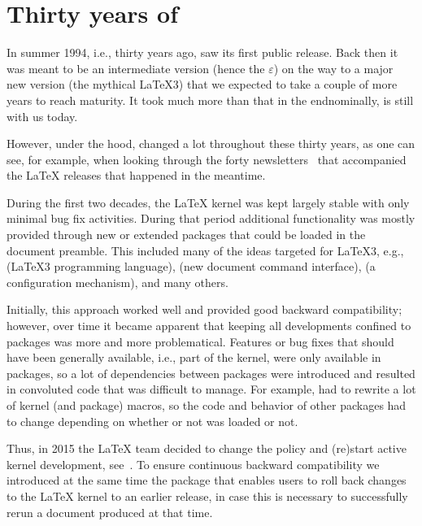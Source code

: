 \documentclass{ltnews}
\providecommand\Dash {\unskip \textemdash}
\begin{document}
\maketitle
{  \spaceskip=3.33pt 
\tableofcontents}

\setlength{}

\medskip


\section{Thirty years of \LaTeXe{}}

In summer 1994, i.e., thirty years ago, \LaTeXe{} saw its first public
release. Back then it was meant to be an intermediate version (hence
the $\varepsilon$) on the way to a major new version (the mythical
\LaTeX3) that we expected to take a couple of more years to reach
maturity. It took much more than that in the end\Dash nominally,
\LaTeXe{} is still with us today.

However, under the hood, \LaTeXe{} changed a lot throughout these
thirty years, as one can see, for example, when looking through the
forty newsletters~\cite{40:ltnews} that accompanied the \LaTeX{}
releases that happened in the meantime.

During the first two decades, the \LaTeX{} kernel was kept largely
stable with only minimal bug fix activities. During that period
additional functionality was mostly provided through new or
extended packages that could be loaded in the document preamble. This
included many of the ideas targeted for \LaTeX3{}, e.g., 
(\LaTeX3 programming language),  (new document command
interface),  (a configuration mechanism), and many
others.

Initially, this approach worked well and provided good backward
compatibility; however, over time it became apparent that keeping all
developments confined to packages was more and more problematical.
Features or bug fixes that should have been generally available, i.e.,
part of the kernel, were only available in packages, so a lot of
dependencies between packages were introduced and resulted in
convoluted code that was difficult to manage. For example,
 had to rewrite a lot of kernel (and package) macros, so
the code and behavior of other packages had to change depending on
whether or not  was loaded or not.

Thus, in 2015 the \LaTeX{} team decided to change the policy and
(re)start active kernel development, see~\cite{40:ltnews22}. To ensure
continuous backward compatibility we introduced at the same time the
 package that enables users to roll back changes to
the \LaTeX{} kernel to an earlier release, in case this is necessary
to successfully rerun a document produced at that time.
\end{document}
